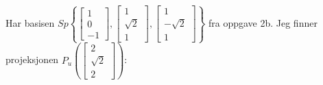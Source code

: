 \documentclass[11pt, a4paper, norsk]{NTNUoving}
\begin{document}
\begin{oppgave}
\begin{punkt}
            Har basisen $Sp\left\{\begin{bmatrix}
                1 \\
                0 \\
                -1
            \end{bmatrix}, \begin{bmatrix}
                1 \\
                \sqrt{2} \\
                1
            \end{bmatrix}, \begin{bmatrix}
                1 \\
                -\sqrt{2} \\
                1
        \end{bmatrix}\right\}$ fra oppgave 2b. Jeg finner projeksjonen $P_{u}\left(\begin{bmatrix}
            2 \\
            \sqrt{2} \\
            2
        \end{bmatrix}\right)$:
       

\end{punkt}
\end{oppgave}
\end{document}

